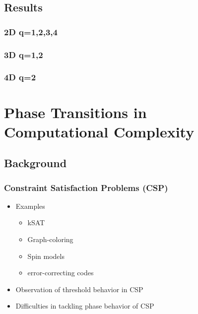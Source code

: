 \documentclass{umthesis}
\begin{document}
\section{Results}
\label{sec-3.3}
\subsection{2D q=1,2,3,4}
\label{sec-3.3.1}
\subsection{3D q=1,2}
\label{sec-3.3.2}
\subsection{4D q=2}
\label{sec-3.3.3}
\chapter{Phase Transitions in Computational Complexity}
\label{sec-4}
\section{Background}
\label{sec-4.1}
\subsection{Constraint Satisfaction Problems (CSP)}
\label{sec-4.1.1}
\begin{itemize}

\item Examples
\label{sec-4.1.1.1}%
\begin{itemize}

\item kSAT\\
\label{sec-4.1.1.1.1}%
\item Graph-coloring\\
\label{sec-4.1.1.1.2}%
\item Spin models\\
\label{sec-4.1.1.1.3}%
\item error-correcting codes\\
\label{sec-4.1.1.1.4}%
\end{itemize} %

\item Observation of threshold behavior in CSP\\
\label{sec-4.1.1.2}%
\item Difficulties in tackling phase behavior of CSP\\
\label{sec-4.1.1.3}%
\end{itemize} %
\end{document}

